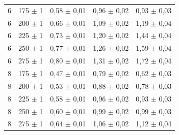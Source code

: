 \begin{table}[H]
\begin{tabular}{ccccc}
6 & 175 $\pm$ 1 & 0,58 $\pm$ 0,01 & 0,96 $\pm$ 0,02 & 0,93 $\pm$ 0,03 \\
6 & 200 $\pm$ 1 & 0,66 $\pm$ 0,01 & 1,09 $\pm$ 0,02 & 1,19 $\pm$ 0,04 \\
6 & 225 $\pm$ 1 & 0,73 $\pm$ 0,01 & 1,20 $\pm$ 0,02 & 1,44 $\pm$ 0,04 \\
6 & 250 $\pm$ 1 & 0,77 $\pm$ 0,01 & 1,26 $\pm$ 0,02 & 1,59 $\pm$ 0,04 \\
6 & 275 $\pm$ 1 & 0,80 $\pm$ 0,01 & 1,31 $\pm$ 0,02 & 1,72 $\pm$ 0,04 \\
\midrule
8 & 175 $\pm$ 1 & 0,47 $\pm$ 0,01 & 0,79 $\pm$ 0,02 & 0,62 $\pm$ 0,03 \\
8 & 200 $\pm$ 1 & 0,53 $\pm$ 0,01 & 0,88 $\pm$ 0,02 & 0,78 $\pm$ 0,03 \\
8 & 225 $\pm$ 1 & 0,58 $\pm$ 0,01 & 0,96 $\pm$ 0,02 & 0,93 $\pm$ 0,03 \\
8 & 250 $\pm$ 1 & 0,60 $\pm$ 0,01 & 0,99 $\pm$ 0,02 & 0,99 $\pm$ 0,03 \\
8 & 275 $\pm$ 1 & 0,64 $\pm$ 0,01 & 1,06 $\pm$ 0,02 & 1,12 $\pm$ 0,04 \\
\bottomrule
\end{tabular}
\end{table}

